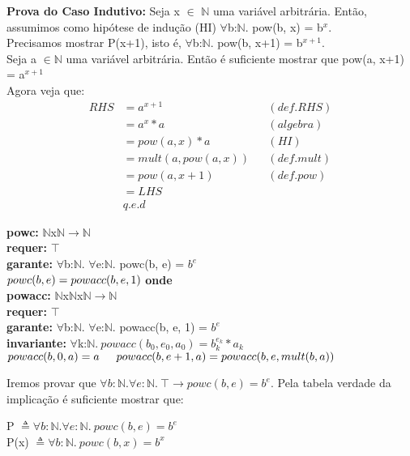 \documentclass{article}
\begin{document}
\noindent \textbf{Prova do Caso Indutivo:} Seja x $\in$ $\mathbb{N}$ uma variável arbitrária. Então, assumimos como hipótese de indução (HI)
$\forall$b:$\mathbb{N}$. pow(b, x) = b$^x$.\\
Precisamos mostrar P(x+1), isto é, $\forall$b:$\mathbb{N}$. pow(b, x+1) = b$^{x+1}$.\\
Seja a $\in \mathbb{N}$ uma variável arbitrária. Então é suficiente mostrar que pow(a, x+1) = a$^{x+1}$\\
Agora veja que:
\begin{align*}
RHS &= a^{x+1} && (def. RHS)\\
&= a^x * a && (algebra)\\
&= pow(a, x) * a && (HI)\\
&= mult(a, pow(a, x)) && (def. mult)\\
&= pow(a, x+1) && (def. pow)\\
&= LHS\\
& q.e.d
\end{align*}

\noindent \textbf{powc:} $\mathbb{N}$x$\mathbb{N}$$ \rightarrow \mathbb{N}$\\
\textbf{requer:} $\top$\\
\textbf{garante:} $\forall$b:$\mathbb{N}$. $\forall$e:$\mathbb{N}$. powc(b, e) = $b^e$\\
$powc(b, e) = powacc(b, e, 1)\\$
\textbf{onde}\\
\indent \textbf{powacc:} $\mathbb{N}$x$\mathbb{N}$x$\mathbb{N}$$ \rightarrow \mathbb{N}$\\
\indent \textbf{requer:} $\top$\\
\indent \textbf{garante:} $\forall$b:$\mathbb{N}$. $\forall$e:$\mathbb{N}$. powacc(b, e, 1) = $b^e$\\
\indent \textbf{invariante:} $\forall$k:$\mathbb{N}.\: powacc(b_0,e_0,a_0) = b_k^{e_k}*a_k$\\
\indent $powacc(b, 0, a) = a\\
\indent powacc(b, e+1, a) = powacc(b, e, mult(b, a))\\$

\noindent Iremos provar que $\forall b:\mathbb{N}.\forall e:\mathbb{N}.\: \top \rightarrow powc(b, e) = b^e$. Pela tabela verdade da implicação é suficiente mostrar que:\\
\begin{center}
P $\triangleq \forall b:\mathbb{N}.\forall e:\mathbb{N}.\: powc(b, e) = b^e$\\
P(x) $\triangleq \forall b:\mathbb{N}.\: powc(b, x) = b^x$
\end{center}
\end{document}
